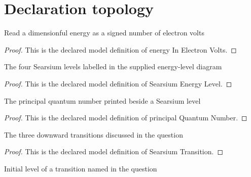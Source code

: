 \section{Declaration topology}
\begin{definition}
  \label{def:physics:phyx-mini-0518:phyxminiproblems-problemphyxmini0518-energyinelectronvolts}
  Read a dimensionful energy as a signed number of electron volts
\end{definition}
\begin{proof}
  This is the declared model definition of energy In Electron Volts.
\end{proof}
\begin{definition}
  \label{def:physics:phyx-mini-0518:phyxminiproblems-problemphyxmini0518-searsiumenergylevel}
  The four Searsium levels labelled in the supplied energy-level diagram
\end{definition}
\begin{proof}
  This is the declared model definition of Searsium Energy Level.
\end{proof}
\begin{definition}
  \label{def:physics:phyx-mini-0518:phyxminiproblems-problemphyxmini0518-principalquantumnumber}
  The principal quantum number printed beside a Searsium level
\end{definition}
\begin{proof}
  This is the declared model definition of principal Quantum Number.
\end{proof}
\begin{definition}
  \label{def:physics:phyx-mini-0518:phyxminiproblems-problemphyxmini0518-searsiumtransition}
  The three downward transitions discussed in the question
\end{definition}
\begin{proof}
  This is the declared model definition of Searsium Transition.
\end{proof}
\begin{definition}
  \label{def:physics:phyx-mini-0518:phyxminiproblems-problemphyxmini0518-transitioninitiallevel}
  Initial level of a transition named in the question
\end{definition}
